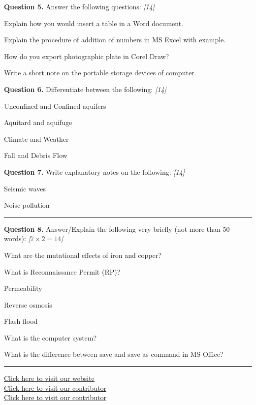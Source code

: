 \documentclass[11pt,a4paper]{article}
\newcommand{\pts}[1]{\hfill   \textit{[#1]}}
\begin{document}
\medskip


\noindent   \textbf{Question 5.} Answer the following questions: \pts{14}

\begin{parts}
  \item Explain how you would insert a table in a Word document.
  \item Explain the procedure of addition of numbers in MS Excel with example.
  \item How do you export photographic plate in Corel Draw?
  \item Write a short note on the portable storage devices of computer.
\end{parts}

\medskip


\noindent   \textbf{Question 6.} Differentiate between the following: \pts{14}

\begin{parts}
  \item Unconfined and Confined aquifers
  \item Aquitard and aquifuge
  \item Climate and Weather
  \item Fall and Debris Flow
\end{parts}

\medskip


\noindent   \textbf{Question 7.} Write explanatory notes on the following: \pts{14}

\begin{parts}
  \item Seismic waves
  \item Noise pollution
\end{parts}

\bigskip


\rule{\linewidth}{0.4pt}\smallskip




\noindent   \textbf{Question 8.} Answer/Explain the following very briefly (not more than 50 words): \pts{$7  \times 2 = 14$}

\begin{parts}
  \item What are the mutational effects of iron and copper?
  \item What is Reconnaissance Permit (RP)?
  \item Permeability
  \item Reverse osmosis
  \item Flash flood
  \item What is the computer system?
  \item What is the difference between save and save as command in MS Office?
\end{parts}

\vfill\rule{\linewidth}{0.4pt}

\begin{center}\small
\href{https://bhu-exam.vercel.app/}{Click here to visit our website}\\[4pt]
\href{https://me-aryan.vercel.app/}{Click here to visit our contributor}\\[4pt]
\href{https://quashan-me.vercel.app/}{Click here to visit our contributor}
\end{center}
\end{document}

